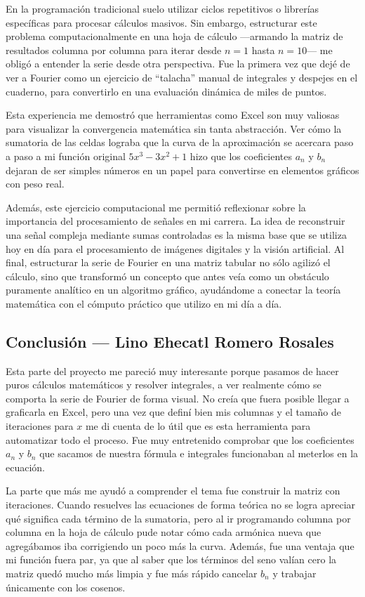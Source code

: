 En la programación tradicional suelo utilizar ciclos repetitivos o librerías específicas para procesar cálculos masivos. Sin embargo, estructurar este problema computacionalmente en una hoja de cálculo —armando la matriz de resultados columna por columna para iterar desde $n=1$ hasta $n=10$— me obligó a entender la serie desde otra perspectiva. Fue la primera vez que dejé de ver a Fourier como un ejercicio de ``talacha'' manual de integrales y despejes en el cuaderno, para convertirlo en una evaluación dinámica de miles de puntos.

Esta experiencia me demostró que herramientas como Excel son muy valiosas para visualizar la convergencia matemática sin tanta abstracción. Ver cómo la sumatoria de las celdas lograba que la curva de la aproximación se acercara paso a paso a mi función original $5x^3 - 3x^2 + 1$ hizo que los coeficientes $a_n$ y $b_n$ dejaran de ser simples números en un papel para convertirse en elementos gráficos con peso real.

Además, este ejercicio computacional me permitió reflexionar sobre la importancia del procesamiento de señales en mi carrera. La idea de reconstruir una señal compleja mediante sumas controladas es la misma base que se utiliza hoy en día para el procesamiento de imágenes digitales y la visión artificial. Al final, estructurar la serie de Fourier en una matriz tabular no sólo agilizó el cálculo, sino que transformó un concepto que antes veía como un obstáculo puramente analítico en un algoritmo gráfico, ayudándome a conectar la teoría matemática con el cómputo práctico que utilizo en mi día a día.

\subsection{Conclusión — Lino Ehecatl Romero Rosales}
\label{sec:cap02:concl:lino}

Esta parte del proyecto me pareció muy interesante porque pasamos de hacer puros cálculos matemáticos y resolver integrales, a ver realmente cómo se comporta la serie de Fourier de forma visual. No creía que fuera posible llegar a graficarla en Excel, pero una vez que definí bien mis columnas y el tamaño de iteraciones para $x$ me di cuenta de lo útil que es esta herramienta para automatizar todo el proceso. Fue muy entretenido comprobar que los coeficientes $a_n$ y $b_n$ que sacamos de nuestra fórmula e integrales funcionaban al meterlos en la ecuación.

La parte que más me ayudó a comprender el tema fue construir la matriz con iteraciones. Cuando resuelves las ecuaciones de forma teórica no se logra apreciar qué significa cada término de la sumatoria, pero al ir programando columna por columna en la hoja de cálculo pude notar cómo cada armónica nueva que agregábamos iba corrigiendo un poco más la curva. Además, fue una ventaja que mi función fuera par, ya que al saber que los términos del seno valían cero la matriz quedó mucho más limpia y fue más rápido cancelar $b_n$ y trabajar únicamente con los cosenos.

